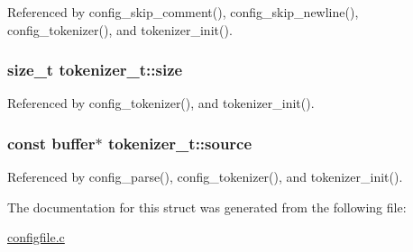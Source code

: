 Referenced by config\-\_\-skip\-\_\-comment(), config\-\_\-skip\-\_\-newline(), config\-\_\-tokenizer(), and tokenizer\-\_\-init().

\hypertarget{structtokenizer__t_ad4f8dd1819c2d7221ed42e227f04415a}{
\subsubsection[{size}]{\setlength{\rightskip}{0pt plus 5cm}size\-\_\-t tokenizer\-\_\-t\-::size}}\label{structtokenizer__t_ad4f8dd1819c2d7221ed42e227f04415a}


Referenced by config\-\_\-tokenizer(), and tokenizer\-\_\-init().

\hypertarget{structtokenizer__t_a36898b19827fb75aa490f0cb73defe97}{
\subsubsection[{source}]{\setlength{\rightskip}{0pt plus 5cm}const {\bf buffer}$\ast$ tokenizer\-\_\-t\-::source}}\label{structtokenizer__t_a36898b19827fb75aa490f0cb73defe97}


Referenced by config\-\_\-parse(), config\-\_\-tokenizer(), and tokenizer\-\_\-init().



The documentation for this struct was generated from the following file\-:\begin{DoxyCompactItemize}
\item 
\hyperlink{configfile_8c}{configfile.\-c}\end{DoxyCompactItemize}
